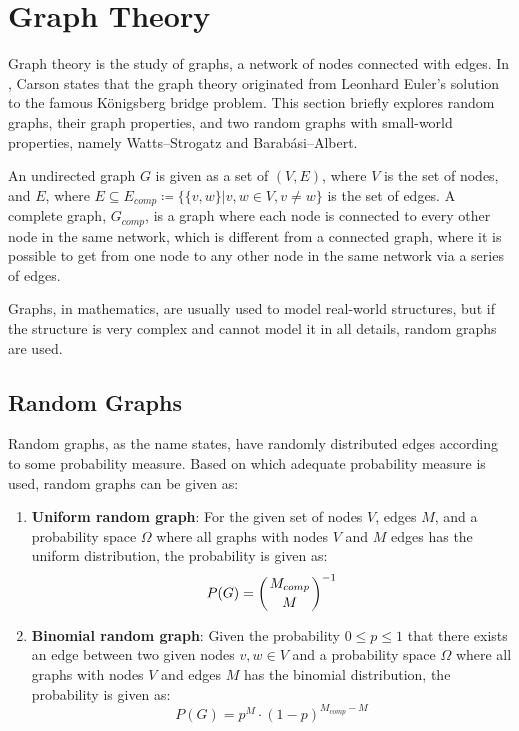
\newpage
\section{Graph Theory}\label{section:graphs}

Graph theory is the study of graphs, a network of nodes connected with edges. In \cite{carlson}, Carson states that the graph theory originated from Leonhard Euler's solution to the famous Königsberg bridge problem. This section briefly explores random graphs, their graph properties, and two random graphs with small-world properties, namely Watts–Strogatz and Barabási–Albert.

An undirected graph $G$ is given as a set of $(V, E)$, where $V$ is the set of nodes, and $E$, where $E \subseteq E_{comp} \coloneqq \{\{v, w\} | v, w \in V, v \neq w\}$ is the set of edges. A complete graph, $G_{comp}$, is a graph where each node is connected to every other node in the same network, which is different from a connected graph, where it is possible to get from one node to any other node in the same network via a series of edges.

Graphs, in mathematics, are usually used to model real-world structures, but if the structure is very complex and cannot model it in all details, random graphs are used.

\subsection{Random Graphs}\label{subsection:randomgraphs}

Random graphs, as the name states, have randomly distributed edges according to some probability measure. Based on which adequate probability measure is used, random graphs can be given as:

\begin{enumerate}
    \item \textbf{Uniform random graph}: For the given set of nodes $V$, edges $M$, and a probability space $\Omega$ where all graphs with nodes $V$ and $M$ edges has the uniform distribution, the probability is given as:
    \begin{equation}
        P(G) = \left( M_{comp} \atop M \right)^{-1}
    \end{equation}
    
    \item \textbf{Binomial random graph}: Given the probability $0 \leq p \leq 1$ that there exists an edge between two given nodes $v, w \in V$ and a probability space $\Omega$ where all graphs with nodes $V$ and edges $M$ has the binomial distribution, the probability is given as:
    \begin{equation}
        P(G) = p^M \cdot (1-p)^{M_{comp}-M}
    \end{equation}
\end{enumerate}

